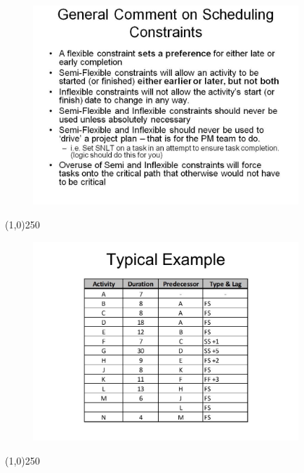 \begin{frame}
\begin{figure}
	\centering
		\includegraphics[width = 10.0cm]{oldnotes/Slide188.jpg}
\end{figure}
\end{frame}
\begin{center}\line(1,0){250}\end{center}




\begin{frame}
\begin{figure}
	\centering
		\includegraphics[width = 10.0cm]{oldnotes/Slide189.jpg}
\end{figure}
\end{frame}
\begin{center}\line(1,0){250}\end{center}




